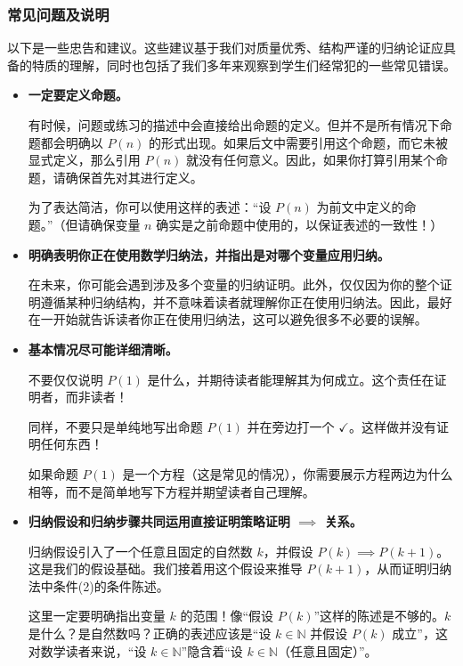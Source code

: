 \subsubsection*{常见问题及说明}

以下是一些忠告和建议。这些建议基于我们对质量优秀、结构严谨的归纳论证应具备的特质的理解，同时也包括了我们多年来观察到学生们经常犯的一些常见错误。

\begin{itemize}
    \item \textbf{一定要定义命题。}
    
    有时候，问题或练习的描述中会直接给出命题的定义。但并不是所有情况下命题都会明确以 $P(n)$ 的形式出现。如果后文中需要引用这个命题，而它未被显式定义，那么引用 $P(n)$ 就没有任何意义。因此，如果你打算引用某个命题，请确保首先对其进行定义。

    为了表达简洁，你可以使用这样的表述：``设 $P(n)$ 为前文中定义的命题。''（但请确保变量 $n$ 确实是之前命题中使用的，以保证表述的一致性！）

    \item \textbf{明确表明你正在使用数学归纳法，并指出是对哪个变量应用归纳。}
    
    在未来，你可能会遇到涉及多个变量的归纳证明。此外，仅仅因为你的整个证明遵循某种归纳结构，并不意味着读者就理解你正在使用归纳法。因此，最好在一开始就告诉读者你正在使用归纳法，这可以避免很多不必要的误解。

    \item \textbf{基本情况尽可能详细清晰。}
    
    不要仅仅说明 $P(1)$ 是什么，并期待读者能理解其为何成立。这个责任在证明者，而非读者！

    同样，不要只是单纯地写出命题 $P(1)$ 并在旁边打一个 $\checkmark$。这样做并没有证明任何东西！

    如果命题 $P(1)$ 是一个方程（这是常见的情况），你需要展示方程两边为什么相等，而不是简单地写下方程并期望读者自己理解。

    \item \textbf{归纳假设和归纳步骤共同运用直接证明策略证明 $\implies$ 关系。}
    
    归纳假设引入了一个任意且固定的自然数 $k$，并假设 $P(k) \implies P(k+1)$。这是我们的假设基础。我们接着用这个假设来推导 $P(k+1)$，从而证明归纳法中条件(2)的条件陈述。

    这里一定要明确指出变量 $k$ 的范围！像``假设 $P(k)$''这样的陈述是不够的。$k$ 是什么？是自然数吗？正确的表述应该是``设 $k \in \mathbb{N}$ 并假设 $P(k)$ 成立''，这对数学读者来说，``设 $k \in \mathbb{N}$''隐含着``设 $k \in \mathbb{N}$（任意且固定）''。


\end{itemize}
